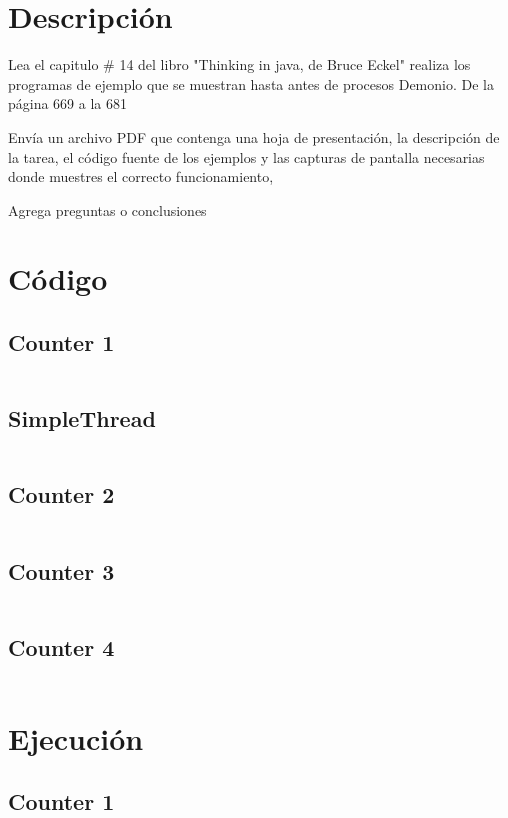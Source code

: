 \documentclass[12pt]{article}
\author{Pablo Vargas Bermúdez}
\begin{document}
\pagestyle{empty}



\section*{Descripción}

Lea el capitulo \# 14 del libro "Thinking in java, de Bruce Eckel"
realiza los programas de ejemplo que se muestran hasta antes de
procesos Demonio. De la página 669 a la 681

Envía un archivo PDF que contenga una hoja de presentación, la
descripción de la tarea, el código fuente de los ejemplos y las
capturas de pantalla necesarias donde muestres el correcto
funcionamiento,

Agrega preguntas o conclusiones

\section*{Código}

\subsection*{Counter 1}
\inputminted{Java}{Counter1.java}
\subsection*{SimpleThread}
\inputminted{Java}{SimpleThread.java}
\subsection*{Counter 2}
\inputminted{Java}{Counter2.java}
\subsection*{Counter 3}
\inputminted{Java}{Counter3.java}
\subsection*{Counter 4}
\inputminted{Java}{Counter4.java}

\section*{Ejecución}

\subsection*{Counter 1}
\end{document}
